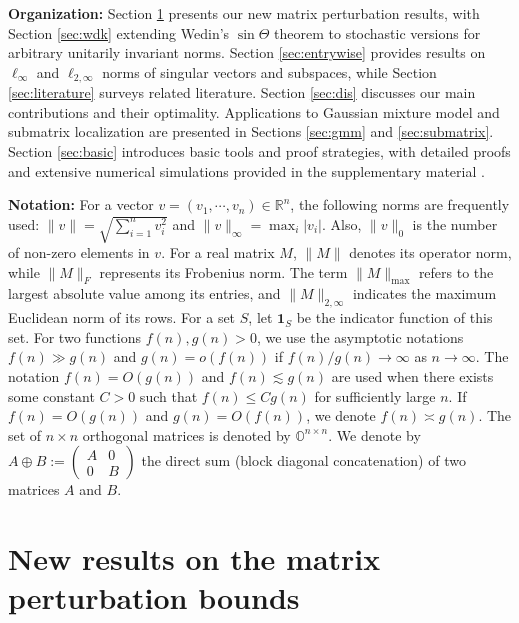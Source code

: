 \documentclass[reqno]{amsart}
\theoremstyle{plain}
\theoremstyle{definition}
\begin{document}
\medskip

\noindent\textbf{Organization:} 
Section \ref{sec:main} presents our new matrix perturbation results, with Section \ref{sec:wdk} extending Wedin's $\sin\Theta$ theorem to stochastic versions for arbitrary unitarily invariant norms. Section \ref{sec:entrywise} provides results on $\ell_{\infty}$ and $\ell_{2,\infty}$ norms of singular vectors and subspaces, while Section \ref{sec:literature} surveys related literature. Section \ref{sec:dis} discusses our main contributions and their optimality. Applications to Gaussian mixture model and submatrix localization are presented in Sections \ref{sec:gmm} and \ref{sec:submatrix}. Section \ref{sec:basic} introduces basic tools and proof strategies, with detailed proofs and extensive numerical simulations provided in the supplementary material \cite{WangSupp24}.

\medskip

\noindent\textbf{Notation:} For a vector $v=(v_1,\cdots,v_n)\in \mathbb{R}^n$, the following norms are frequently used: $\|v\| = \sqrt{\sum_{i=1}^n v_i^2}$ and $\|v\|_\infty = \max_{i} |v_i|$. Also, $\|v\|_0$ is the number of non-zero elements in $v$. For a real matrix $M$, $\|M\|$ denotes its operator norm, while $\|M\|_F$ represents its Frobenius norm. The term $\|M\|_{\max}$ refers to the largest absolute value among its entries, and $\|M\|_{2,\infty}$ indicates the maximum Euclidean norm of its rows. For a set $S$, let $\mathbf{1}_S$ be the indicator function of this set. For two functions $f(n),g(n)>0$, we use the asymptotic notations $f(n)\gg g(n)$ and $g(n)=o(f(n))$ if $f(n)/g(n)\to \infty$ as $n\to \infty$. The notation $f(n)=O(g(n))$ and $f(n)\lesssim g(n)$ are used when there exists some constant $C > 0$ such that $f(n) \leq Cg(n)$ for sufficiently large $n$. If $f(n)=O(g(n))$ and $g(n)=O(f(n))$, we denote $f(n) \asymp g(n)$. The set of $n\times n$ orthogonal matrices is denoted by $\mathbb O^{n\times n}$. We denote by $
A \oplus B := \begin{pmatrix}
A & 0 \\
0 & B
\end{pmatrix}
$ the direct sum (block diagonal concatenation) of two matrices \( A \) and \( B \). 



\section{New results on the matrix perturbation bounds}\label{sec:main}
\end{document}
